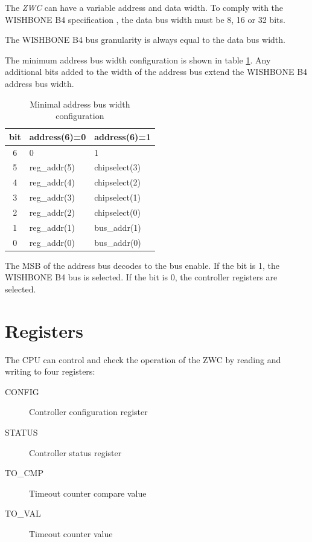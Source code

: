 \documentclass[a4paper,twocolumn,12pt]{article}
\begin{document}
The \emph{ZWC} can have a variable address and data width. To comply with the WISHBONE B4 specification \cite{wishbone}, the data bus width must be 8, 16 or 32 bits.

The WISHBONE B4 \cite{wishbone} bus granularity is always equal to the data bus width.

The minimum address bus width configuration is shown in table \ref{tab:min_address}. Any additional bits added to the width of the address bus extend the WISHBONE B4 \cite{wishbone} address bus width.

\begin{table}[h]
\label{tab:min_address}
\begin{tabular}{| c | l | l |
}
    \hline
    bit & address(6)=0 & address(6)=1 \\ \hline \hline
    6 & 0 & 1 \\ \hline
    5 & reg\_addr(5) & chipselect(3) \\ \hline
    4 & reg\_addr(4) & chipselect(2) \\ \hline
    3 & reg\_addr(3) & chipselect(1) \\ \hline
    2 & reg\_addr(2) & chipselect(0) \\ \hline
    1 & reg\_addr(1) & bus\_addr(1) \\ \hline
    0 & reg\_addr(0) & bus\_addr(0) \\ \hline
\end{tabular}
\caption{Minimal address bus width configuration}
\end{table}

The MSB of the address bus decodes to the bus enable. If the bit is 1, the WISHBONE B4 \cite{wishbone} bus is selected. If the bit is 0, the controller registers are selected.

\section{Registers}

The CPU can control and check the operation of the ZWC by reading and writing to four registers:

\begin{description}
    \item[CONFIG] Controller configuration register
    \item[STATUS] Controller status register
    \item[TO\_CMP] Timeout counter compare value
    \item[TO\_VAL] Timeout counter value
\end{description}
\end{document}
